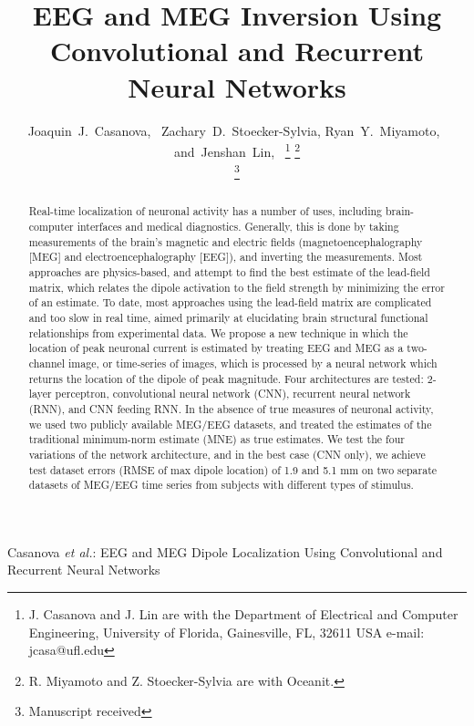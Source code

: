 \documentclass[journal]{IEEEtran}
\begin{document}

\title{EEG and MEG Inversion Using Convolutional and Recurrent Neural Networks}


\author{Joaquin~J.~Casanova,~
        Zachary~D.~Stoecker-Sylvia,
        Ryan~Y.~Miyamoto,~
        and~Jenshan~Lin,~%
\thanks{J. Casanova and J. Lin are with the Department
of Electrical and Computer Engineering, University of Florida, Gainesville,
FL, 32611 USA e-mail: jcasa@ufl.edu}%
\thanks{R. Miyamoto and Z. Stoecker-Sylvia are with Oceanit.}%

\thanks{Manuscript received }}

%
{Casanova \MakeLowercase{\textit{et al.}}: EEG and MEG Dipole Localization Using Convolutional and Recurrent Neural Networks}
\maketitle

\begin{abstract}

  Real-time localization of neuronal activity has a number of uses, including brain-computer interfaces and medical diagnostics. Generally, this is done by taking measurements of the brain's magnetic and electric fields (magnetoencephalography [MEG] and electroencephalography [EEG]), and inverting the measurements. Most approaches are physics-based, and attempt to find the best estimate of the lead-field matrix, which relates the dipole activation to the field strength by minimizing the error of an estimate. To date, most approaches using the lead-field matrix are complicated and too slow in real time, aimed primarily at elucidating brain structural functional relationships from experimental data. We propose a new technique in which the location of peak neuronal current is estimated by treating EEG and MEG as a two-channel image, or time-series of images, which is processed by a neural network which returns the location of the dipole of peak magnitude. Four architectures are tested: 2-layer perceptron, convolutional neural network (CNN), recurrent neural network (RNN), and CNN feeding RNN. In the absence of true measures of neuronal activity, we used two publicly available MEG/EEG datasets, and treated the estimates of the traditional minimum-norm estimate (MNE) as true estimates. We test the four variations of the network architecture, and in the best case (CNN only), we achieve test dataset errors (RMSE of max dipole location) of 1.9 and 5.1 mm on two separate datasets of MEG/EEG time series from subjects with different types of stimulus.
  
\end{abstract}
\end{document}
